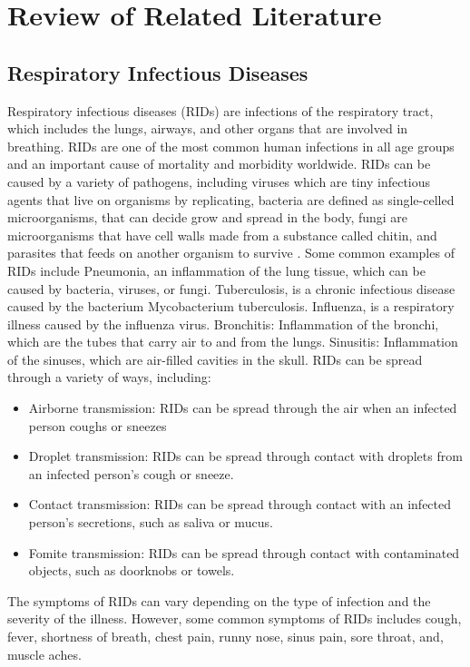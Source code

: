 \chapter{Review of Related Literature}
\label{chap:Review of Related Literature}
 
 \section{Respiratory Infectious Diseases}

Respiratory infectious diseases (RIDs) are infections of the respiratory tract, which includes the lungs, airways, and other organs that are involved in breathing\cite{a2011_infectious}. RIDs are one of the most common human infections in all age groups and an important cause of mortality and morbidity worldwide. RIDs can be caused by a variety of pathogens, including viruses which are tiny infectious agents that live on organisms by replicating, bacteria are defined as single-celled microorganisms, that can decide grow and spread in the body, fungi are microorganisms that have cell walls made from a substance called chitin, and parasites that feeds on another organism to survive \cite{a2020_covid19}. Some common examples of RIDs include Pneumonia, an inflammation of the lung tissue, which can be caused by bacteria, viruses, or fungi. Tuberculosis, is a chronic infectious disease caused by the bacterium Mycobacterium tuberculosis\cite{a2011_infectious}. Influenza, is a respiratory illness caused by the influenza virus. Bronchitis: Inflammation of the bronchi, which are the tubes that carry air to and from the lungs. Sinusitis: Inflammation of the sinuses, which are air-filled cavities in the skull. RIDs can be spread through a variety of ways, including:

\begin{itemize}
	\item Airborne transmission: RIDs can be spread through the air when an infected person coughs or sneezes \cite{a2011_infectious}
	\item Droplet transmission: RIDs can be spread through contact with droplets from an infected person's cough or sneeze.
	\item Contact transmission: RIDs can be spread  through contact with an infected person's secretions, such as saliva or mucus.
	\item Fomite transmission: RIDs can be spread through contact with contaminated objects, such as doorknobs or towels. 
\end{itemize} 
The symptoms of RIDs can vary depending on the type of infection and the severity of the illness. However, some common symptoms of RIDs includes cough, fever, shortness of breath, chest pain, runny nose, sinus pain, sore throat, and, muscle aches\cite{a2011_infectious}. 

